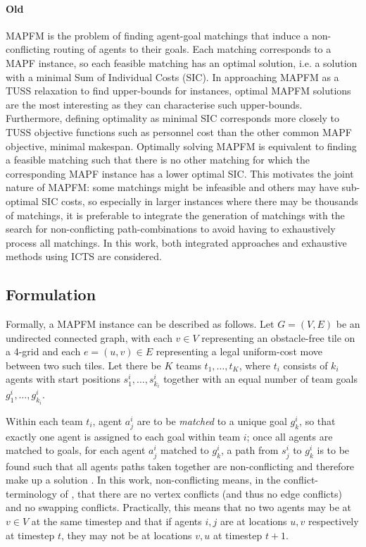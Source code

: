 \documentclass[english]{article}
\begin{document}
	\paragraph{Old}
	MAPFM is the problem of finding agent-goal matchings that induce a non-conflicting routing of agents to their goals. Each matching corresponds to a MAPF instance, so each feasible matching has an optimal solution, i.e. a solution with a minimal Sum of Individual Costs (SIC). In approaching MAPFM as a TUSS relaxation to find upper-bounds for instances, optimal MAPFM solutions are the most interesting as they can characterise such upper-bounds. Furthermore, defining optimality as minimal SIC corresponds more closely to TUSS objective functions such as personnel cost than the other common MAPF objective, minimal makespan. Optimally solving MAPFM is equivalent to finding a feasible matching such that there is no other matching for which the corresponding MAPF instance has a lower optimal SIC. This motivates the joint nature of MAPFM: some matchings might be infeasible and others may have sub-optimal SIC costs, so especially in larger instances where there may be thousands of matchings, it is preferable to integrate the generation of matchings with the search for non-conflicting path-combinations to avoid having to exhaustively process all matchings. In this work, both integrated approaches and exhaustive methods using ICTS are considered.
		
	\subsection{Formulation}
	Formally, a MAPFM instance can be described as follows. Let $G = (V,E)$ be an undirected connected graph, with each $v\in V$ representing an obstacle-free tile on a 4-grid and each $e = (u,v)\in E$ representing a legal uniform-cost move between two such tiles. Let there be $K$ teams $t_1,\ldots, t_K$, where $t_i$ consists of $k_i$ agents with start positions $s_1^i,\ldots,s_{k_i}^i$ together with an equal number of team goals $g_1^i,\ldots,g_{k_i}^i$. 
	
	Within each team $t_i$, agent $a_j^i$ are to be \textit{matched} to a unique goal $g_k^i$, so that exactly one agent is assigned to each goal within team $i$; once all agents are matched to goals, for each agent $a_j^i$ matched to $g_k^i$, a path from $s_j^i$ to $g_k^i$ is to be found such that all agents paths taken together are non-conflicting and therefore make up a solution \cite{ma2016}. In this work, non-conflicting means, in the conflict-terminology of \cite{stern2019}, that there are no vertex conflicts (and thus no edge conflicts) and no swapping conflicts. Practically, this means that no two agents may be at $v\in V$ at the same timestep and that if agents $i,j$ are at locations $u,v$ respectively at timestep $t$, they may not be at locations $v,u$ at timestep $t+1$. 
	\printbibliography
	
\end{document}
